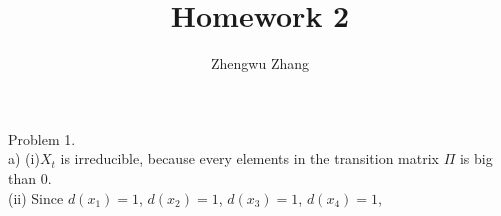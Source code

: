 \documentclass[12pt] {article}
\author{Zhengwu Zhang}
\title{Homework 2}
\begin{document}
 
\maketitle
 
\newpage
Problem 1. \\
a) (i)$X_t$ is irreducible, because every elements in the transition matrix $\Pi$ is big than 0. \\
 (ii) Since $d(x_1)=1$, $d(x_2)=1$, $d(x_3)=1$, $d(x_4)=1$, 
\end{document}
